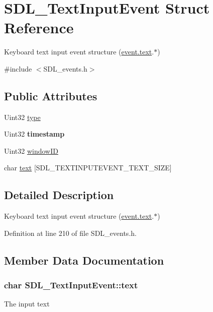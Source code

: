 \hypertarget{structSDL__TextInputEvent}{\section{S\+D\+L\+\_\+\+Text\+Input\+Event Struct Reference}
\label{structSDL__TextInputEvent}
}


Keyboard text input event structure (\hyperlink{unionSDL__Event_aa4fc65c559d69f33c057c0c23d8414b8}{event.\+text}.$\ast$)  




{\ttfamily \#include $<$S\+D\+L\+\_\+events.\+h$>$}

\subsection*{Public Attributes}
\begin{DoxyCompactItemize}
\item 
Uint32 \hyperlink{structSDL__TextInputEvent_a90576be2ea52e694deff40d0586654f5}{type}
\item 
\hypertarget{structSDL__TextInputEvent_a20b190a96494918690ea7f99187be948}{Uint32 {\bfseries timestamp}}\label{structSDL__TextInputEvent_a20b190a96494918690ea7f99187be948}

\item 
Uint32 \hyperlink{structSDL__TextInputEvent_aeb4f7a939353990ca40261ffbfbeb3d0}{window\+I\+D}
\item 
char \hyperlink{structSDL__TextInputEvent_a52e2bd1ebacbf62b1c5f6ad140d7a965}{text} \mbox{[}S\+D\+L\+\_\+\+T\+E\+X\+T\+I\+N\+P\+U\+T\+E\+V\+E\+N\+T\+\_\+\+T\+E\+X\+T\+\_\+\+S\+I\+Z\+E\mbox{]}
\end{DoxyCompactItemize}


\subsection{Detailed Description}
Keyboard text input event structure (\hyperlink{unionSDL__Event_aa4fc65c559d69f33c057c0c23d8414b8}{event.\+text}.$\ast$) 

Definition at line 210 of file S\+D\+L\+\_\+events.\+h.



\subsection{Member Data Documentation}
\hypertarget{structSDL__TextInputEvent_a52e2bd1ebacbf62b1c5f6ad140d7a965}{
\subsubsection[{text}]{\setlength{\rightskip}{0pt plus 5cm}char S\+D\+L\+\_\+\+Text\+Input\+Event\+::text}}\label{structSDL__TextInputEvent_a52e2bd1ebacbf62b1c5f6ad140d7a965}
The input text 

